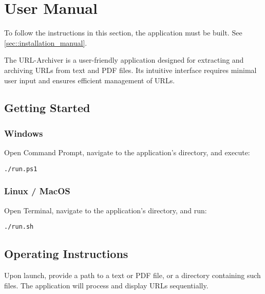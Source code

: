 \section{User Manual}
\begin{bfhWarnBox}
	To follow the instructions in this section, the application must be built. See \ref{sec::installation_manual}.
\end{bfhWarnBox}

The URL-Archiver is a user-friendly application designed for extracting and archiving URLs from text and PDF files. Its intuitive interface requires minimal user input and ensures efficient management of URLs.

\subsection{Getting Started}

\subsubsection{Windows}

Open Command Prompt, navigate to the application's directory, and execute:

\begin{lstlisting}[numbers=none, caption={Script to Run the URL-Archiver Application on Windows (User Manual)}, label={lst:user_run_win}]
	./run.ps1
\end{lstlisting}


\subsubsection{Linux / MacOS}

Open Terminal, navigate to the application's directory, and run:

\begin{lstlisting}[numbers=none, caption={Script to Run the URL-Archiver Application on Linux and macOS (User Manual)}, label={lst:user_run_unix}]
	./run.sh
\end{lstlisting}




\subsection{Operating Instructions}

Upon launch, provide a path to a text or PDF file, or a directory containing such files. The application will process and display URLs sequentially.

